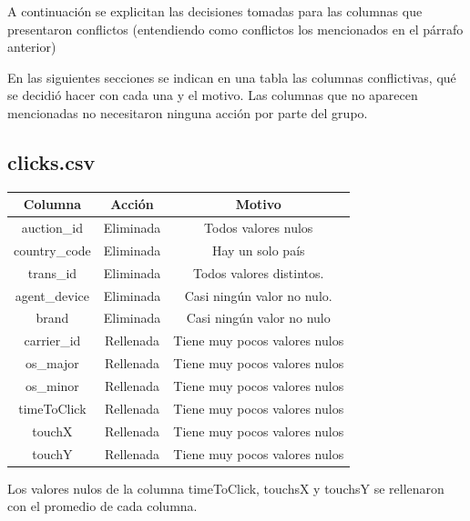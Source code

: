 \documentclass[a4paper, 12pt]{article}
\begin{document}
A continuación se explicitan las decisiones tomadas para las columnas que presentaron conflictos (entendiendo como conflictos los mencionados en el párrafo anterior)

En las siguientes secciones se indican en una tabla las columnas conflictivas, qué se decidió hacer con cada una y el motivo. Las columnas que no aparecen mencionadas no necesitaron ninguna acción por parte del grupo.

\subsection{clicks.csv}

\FloatBarrier
\begin{center}
        \begin{tabular}{ |c|c|c| }
          \hline
          Columna & Acción & Motivo \\
          \hline\hline
          auction\_id & Eliminada & Todos valores nulos \\
          \hline
          country\_code & Eliminada & Hay un solo país \\
          \hline
          trans\_id & Eliminada & Todos valores distintos. \\
          \hline
          agent\_device & Eliminada & Casi ningún valor no nulo. \\
          \hline
          brand & Eliminada & Casi ningún valor no nulo \\
          \hline
          carrier\_id & Rellenada & Tiene muy pocos valores nulos \\
          \hline
          os\_major & Rellenada & Tiene muy pocos valores nulos \\
          \hline
          os\_minor & Rellenada & Tiene muy pocos valores nulos \\
          \hline
          timeToClick & Rellenada & Tiene muy pocos valores nulos \\
          \hline
          touchX & Rellenada & Tiene muy pocos valores nulos \\
          \hline
          touchY & Rellenada & Tiene muy pocos valores nulos \\
          \hline
        \end{tabular}
\end{center}
\FloatBarrier
Los valores nulos de la columna timeToClick, touchsX y touchsY se rellenaron con el promedio de cada columna.
\end{document}

